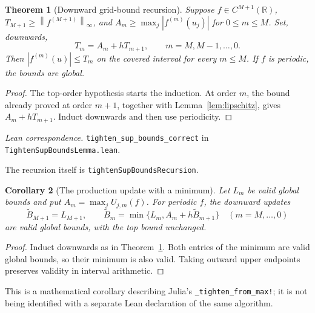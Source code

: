 \documentclass[11pt]{article}
\newtheorem{theorem}{Theorem}[section]
\newtheorem{corollary}[theorem]{Corollary}
\theoremstyle{definition}
\theoremstyle{remark}
\newcommand{\R}{\mathbb R}
\newcommand{\norminf}[1]{\left\|#1\right\|_{\infty}}
\newcommand{\code}[1]{\nolinkurl{#1}}
\newcommand{\leanref}[2]{\par\smallskip\noindent\textit{Lean correspondence.}
  \code{#1} in \code{#2}.\par\smallskip}
\numberwithin{equation}{section}
\begin{document}
\begin{theorem}[Downward grid-bound recursion]
\label{thm:recursion}
Suppose $f\in C^{M+1}(\R)$, $T_{M+1}\geq\norminf{f^{(M+1)}}$, and
$A_m\geq\max_j|f^{(m)}(u_j)|$ for $0\leq m\leq M$. Set, downwards,
\begin{equation}
 T_m=A_m+hT_{m+1},\qquad m=M,M-1,\ldots,0.
\end{equation}
Then $|f^{(m)}(u)|\leq T_m$ on the covered interval for every $m\leq M$.
If $f$ is periodic, the bounds are global.
\end{theorem}
\begin{proof}
The top-order hypothesis starts the induction. At order $m$, the bound
already proved at order $m+1$, together with Lemma~\ref{lem:lipschitz},
gives $A_m+hT_{m+1}$. Induct downwards and then use periodicity.
\end{proof}
\leanref{tighten_sup_bounds_correct}{TightenSupBoundsLemma.lean}
The recursion itself is \code{tightenSupBoundsRecursion}.

\begin{corollary}[The production update with a minimum]
\label{cor:production-tightening}
Let $L_m$ be valid global bounds and put
$A_m=\max_jU_{j,m}(f)$. For periodic $f$, the downward updates
\begin{equation}
 \widetilde B_{M+1}=L_{M+1},\qquad
 \widetilde B_m=\min\{L_m,A_m+h\widetilde B_{m+1}\}\quad(m=M,\ldots,0)
 \label{eq:production-tightening}
\end{equation}
are valid global bounds, with the top bound unchanged.
\end{corollary}
\begin{proof}
Induct downwards as in Theorem~\ref{thm:recursion}. Both entries of the
minimum are valid global bounds, so their minimum is also valid. Taking
outward upper endpoints preserves validity in interval arithmetic.
\end{proof}
This is a mathematical corollary describing Julia's
\code{_tighten_from_max!}; it is not being identified with a separate
Lean declaration of the same algorithm.
\end{document}
